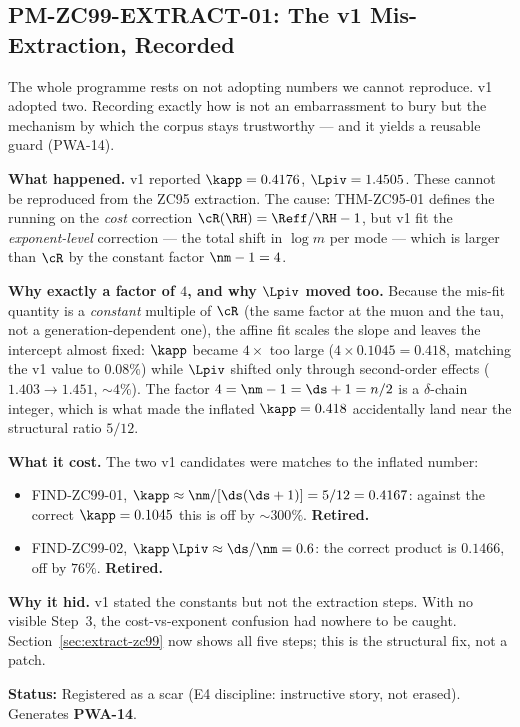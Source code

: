 \documentclass[12pt, a4paper]{article}
\begin{document}
\subsection{PM-ZC99-EXTRACT-01: The v1 Mis-Extraction, Recorded}
\label{sec:scar-zc99}

The whole programme rests on not adopting numbers we cannot reproduce. v1
adopted two. Recording exactly how is not an embarrassment to bury but the
mechanism by which the corpus stays trustworthy --- and it yields a reusable
guard (PWA-14).

\begin{openqbox}[title={PM-ZC99-EXTRACT-01 (SCAR): Fitting the Wrong Quantity}]
\textbf{What happened.} v1 reported $\kapp=0.4176$, $\Lpiv=1.4505$. These cannot
be reproduced from the ZC95 extraction. The cause: THM-ZC95-01 defines the
running on the \emph{cost} correction $\cR(\RH)=\Reff/\RH-1$, but v1 fit the
\emph{exponent-level} correction --- the total shift in $\log m$ per mode ---
which is larger than $\cR$ by the constant factor $\nm-1=4$.

\textbf{Why exactly a factor of $4$, and why $\Lpiv$ moved too.} Because the
mis-fit quantity is a \emph{constant} multiple of $\cR$ (the same factor at the
muon and the tau, not a generation-dependent one), the affine fit scales the
slope and leaves the intercept almost fixed: $\kapp$ became $4\times$ too large
($4\times0.1045=0.418$, matching the v1 value to $0.08\%$) while $\Lpiv$ shifted
only through second-order effects ($1.403\to1.451$, $\sim4\%$). The factor
$4=\nm-1=\ds+1=n/2$ is a $\delta$-chain integer, which is what made the
inflated $\kapp=0.418$ accidentally land near the structural ratio $5/12$.

\textbf{What it cost.} The two v1 candidates were matches to the inflated
number:
\begin{itemize}[leftmargin=1.6em, noitemsep]
  \item FIND-ZC99-01, $\kapp\approx\nm/[\ds(\ds+1)]=5/12=0.4167$: against the
    correct $\kapp=0.1045$ this is off by $\sim300\%$. \textbf{Retired.}
  \item FIND-ZC99-02, $\kapp\,\Lpiv\approx\ds/\nm=0.6$: the correct product is
    $0.1466$, off by $76\%$. \textbf{Retired.}
\end{itemize}

\textbf{Why it hid.} v1 stated the constants but not the extraction steps. With
no visible Step~3, the cost-vs-exponent confusion had nowhere to be caught.
Section~\ref{sec:extract-zc99} now shows all five steps; this is the structural fix,
not a patch.

\textbf{Status:} Registered as a scar (E4 discipline: instructive story, not
erased). Generates \textbf{PWA-14}.
\end{openqbox}
\end{document}

